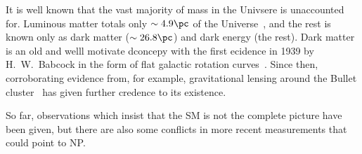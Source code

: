 It is well known that the vast majority of mass in the Univsere is unaccounted for.
Luminous matter totals only $\sim4.9\pc$ of the Universe~\cite{Adam:2015rua,PDG2014}, and the rest
is known only as dark matter ($\sim26.8\pc$) and dark energy (the rest).
Dark matter is an old and welll motivate dconcepy with the first ecidence in 1939 by H.~W.~Babcock
in the form of flat galactic rotation curves~\cite{1970ApJ...159..379R,1980ApJ...238..471R}.
Since then, corroborating evidence from, for example, gravitational lensing around the Bullet
cluster~\cite{Markevitch:2003at} has given further credence to its existence.





So far, observations which insist that the SM is not the complete picture have been given, but
there are also some conflicts in more recent measurements that could point to NP.

